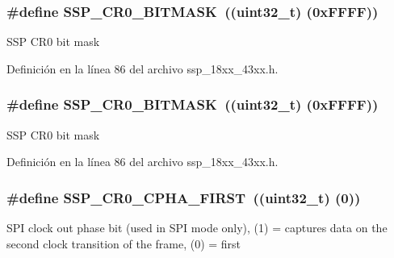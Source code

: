 \subsubsection[{\texorpdfstring{S\+S\+P\+\_\+\+C\+R0\+\_\+\+B\+I\+T\+M\+A\+SK}{SSP_CR0_BITMASK}}]{\setlength{\rightskip}{0pt plus 5cm}\#define S\+S\+P\+\_\+\+C\+R0\+\_\+\+B\+I\+T\+M\+A\+SK~((uint32\+\_\+t) (0x\+F\+F\+F\+F))}\hypertarget{group___s_s_p__18_x_x__43_x_x_ga90be93bebdbdfee011d90ea6e054260a}{}\label{group___s_s_p__18_x_x__43_x_x_ga90be93bebdbdfee011d90ea6e054260a}
S\+SP C\+R0 bit mask 

Definición en la línea 86 del archivo ssp\+\_\+18xx\+\_\+43xx.\+h.

\subsubsection[{\texorpdfstring{S\+S\+P\+\_\+\+C\+R0\+\_\+\+B\+I\+T\+M\+A\+SK}{SSP_CR0_BITMASK}}]{\setlength{\rightskip}{0pt plus 5cm}\#define S\+S\+P\+\_\+\+C\+R0\+\_\+\+B\+I\+T\+M\+A\+SK~((uint32\+\_\+t) (0x\+F\+F\+F\+F))}\hypertarget{group___s_s_p__18_x_x__43_x_x_ga90be93bebdbdfee011d90ea6e054260a}{}\label{group___s_s_p__18_x_x__43_x_x_ga90be93bebdbdfee011d90ea6e054260a}
S\+SP C\+R0 bit mask 

Definición en la línea 86 del archivo ssp\+\_\+18xx\+\_\+43xx.\+h.

\subsubsection[{\texorpdfstring{S\+S\+P\+\_\+\+C\+R0\+\_\+\+C\+P\+H\+A\+\_\+\+F\+I\+R\+ST}{SSP_CR0_CPHA_FIRST}}]{\setlength{\rightskip}{0pt plus 5cm}\#define S\+S\+P\+\_\+\+C\+R0\+\_\+\+C\+P\+H\+A\+\_\+\+F\+I\+R\+ST~((uint32\+\_\+t) (0))}\hypertarget{group___s_s_p__18_x_x__43_x_x_gaee3465bdb33add1970f6ce7f7bc638c4}{}\label{group___s_s_p__18_x_x__43_x_x_gaee3465bdb33add1970f6ce7f7bc638c4}
S\+PI clock out phase bit (used in S\+PI mode only), (1) = captures data on the second clock transition of the frame, (0) = first 

